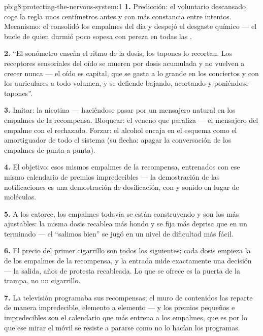 \begin{solution}{pb:g8:protecting-the-nervous-system:1}
\textbf{1.} Predicción: el voluntario descansado coge la regla unos
centímetros antes y con más constancia entre intentos. Mecanismo: el
 consolidó los empalmes del día y despejó el desgaste químico ---
el bucle de quien durmió poco sopesa con pereza en todas las .

\textbf{2.} ``El sonómetro enseña el ritmo de la dosis; los tapones lo
recortan. Los receptores sensoriales del oído se mueren por dosis
acumulada y no vuelven a crecer nunca --- el oído es capital, que se
gasta a lo grande en los conciertos y con los auriculares a todo
volumen, y se defiende bajando, acortando y poniéndose tapones''.

\textbf{3.} Imitar: la nicotina --- haciéndose pasar por un mensajero
natural en los empalmes de la recompensa. Bloquear: el veneno que
paraliza --- el mensajero del empalme con el  rechazado. Forzar:
el alcohol encaja en el esquema como el amortiguador de todo el sistema
(su flecha: apagar la conversación de los empalmes de punta a punta).

\textbf{4.} El objetivo: esos mismos empalmes de la recompensa,
entrenados con ese mismo calendario de premios impredecibles --- la
demostración de las notificaciones es una demostración de dosificación,
con  y sonido en lugar de moléculas.

\textbf{5.} A los catorce, los empalmes todavía se están construyendo y
son los más ajustables: la misma dosis recablea más hondo y se fija más
deprisa que en un  terminado --- el ``salimos bien'' se jugó en
un nivel de dificultad más fácil.

\textbf{6.} El precio del primer cigarrillo son todos los siguientes:
cada dosis empieza la  de los empalmes de la recompensa, y la
entrada mide exactamente una decisión --- la salida, años de protesta
recableada. Lo que se ofrece es la puerta de la trampa, no un
cigarrillo.

\textbf{7.} La televisión programaba sus recompensas; el muro de
contenidos las reparte de manera impredecible, elemento a elemento ---
y los premios pequeños e impredecibles son el calendario que más
entrena a los empalmes, que es por lo que ese mirar el móvil se resiste
a pararse como no lo hacían los programas.


\end{solution}

